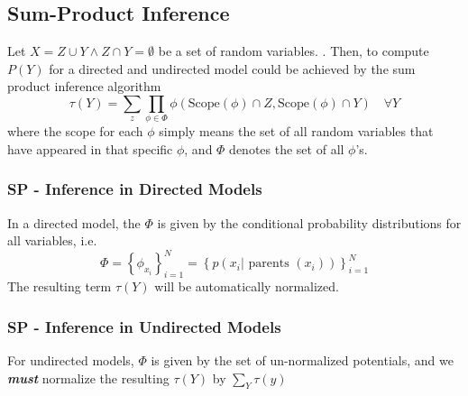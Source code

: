 \documentclass[11pt]{article}
\begin{document}
\subsection{Sum-Product Inference}
Let $X = Z \cup Y \wedge Z \cap Y = \emptyset$ be a set of random variables. . Then, to compute $P(Y)$ for a directed and undirected  model could be achieved by the sum product inference algorithm
\begin{equation}
    \tau(Y)=\sum_{z}\prod_{\phi \in \Phi} \phi\left(\mathrm{Scope}(\phi) \cap Z, \mathrm{Scope}(\phi) \cap Y\right)\quad \forall Y
\end{equation}
where the scope for each $\phi$ simply means the set of all random variables that have appeared in that specific $\phi$, and $\Phi$ denotes the set of all $\phi$'s.

\subsubsection{SP - Inference in  Directed Models}
In a directed model, the $\Phi$ is given by the conditional probability distributions for all variables, i.e.
\begin{equation}
    \Phi=\left\{\phi_{x_{i}}\right\}_{i=1}^{N}=\left\{p\left(x_{i} | \text { parents }\left(x_{i}\right)\right)\right\}_{i=1}^{N}
\end{equation}
The resulting term $\tau(Y)$ will be automatically normalized.

\subsubsection{SP - Inference in Undirected Models}
For undirected models, $\Phi$ is given by the set of un-normalized potentials, and we \textit{\textbf{must}} normalize the resulting $\tau(Y)$ by $\sum_Y \tau(y)$
\end{document}
